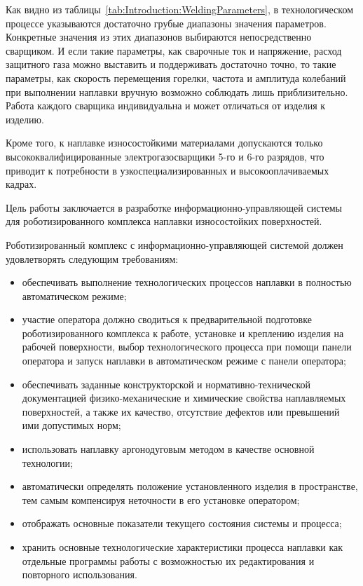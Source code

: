 Как видно из таблицы~\ref{tab:Introduction:WeldingParameters}, в технологическом процессе указываются достаточно грубые диапазоны значения параметров.
Конкретные значения из этих диапазонов выбираются непосредственно сварщиком.
И если такие параметры, как сварочные ток и напряжение, расход защитного газа можно выставить и поддерживать достаточно точно, то такие параметры, как скорость перемещения горелки, частота и амплитуда колебаний при выполнении наплавки вручную возможно соблюдать лишь приблизительно.
Работа каждого сварщика индивидуальна и может отличаться от изделия к изделию.

Кроме того, к наплавке износостойкими материалами допускаются только высококвалифицированные электрогазосварщики 5-го и 6-го разрядов, что приводит к потребности в узкоспециализированных и высокооплачиваемых кадрах.

Цель работы заключается в разработке информационно-управляющей системы для роботизированного комплекса наплавки износостойких поверхностей.

Роботизированный комплекс с информационно-управляющей системой должен удовлетворять следующим требованиям:

\begin{itemize}
    \item обеспечивать выполнение технологических процессов наплавки в полностью автоматическом режиме;
    \item участие оператора должно сводиться к предварительной подготовке роботизированного комплекса к работе, установке и креплению изделия на рабочей поверхности, выбор технологического процесса при помощи панели оператора и запуск наплавки в автоматическом режиме с панели оператора;
    \item обеспечивать заданные конструкторской и нормативно-технической документацией физико-механические и химические свойства наплавляемых поверхностей, а также их качество, отсутствие дефектов или превышений ими допустимых норм;
    \item использовать наплавку аргонодуговым методом в качестве основной технологии;
    \item автоматически определять положение установленного изделия в пространстве, тем самым компенсируя неточности в его установке оператором;
    \item отображать основные показатели текущего состояния системы и процесса;
    \item хранить основные технологические характеристики процесса наплавки как отдельные программы работы с возможностью их редактирования и повторного использования.
\end{itemize}

